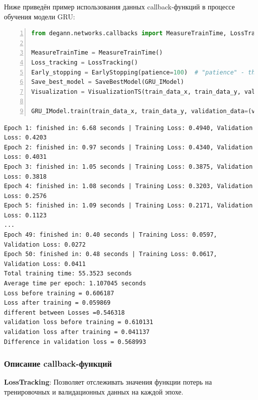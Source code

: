 Ниже приведён пример использования данных callback-функций в процессе обучения модели GRU:

\begin{lstlisting}[language=Python, breaklines, caption=Пример настройки и использования callback-функций, numbers=left]
from degann.networks.callbacks import MeasureTrainTime, LossTracking, EarlyStopping, SaveBestModel, VisualizationTS

MeasureTrainTime = MeasureTrainTime()
Loss_tracking = LossTracking()
Early_stopping = EarlyStopping(patience=100)  # "patience" - the number of epochs without improvement
Save_best_model = SaveBestModel(GRU_IModel)
Visualization = VisualizationTS(train_data_x, train_data_y, val_data_x, val_data_y, name_dataset.split('_')[0], funcs)

GRU_IModel.train(train_data_x, train_data_y, validation_data=(val_data_x, val_data_y), epochs=epochs, verbose=0, callbacks=[MeasureTrainTime, Loss_tracking, Early_stopping, Save_best_model, Visualization])
\end{lstlisting}

\begin{lstlisting}[language=Tex, breaklines, caption=Пример получения данных от callback-функций]
Epoch 1: finished in: 6.68 seconds | Training Loss: 0.4940, Validation Loss: 0.4203
Epoch 2: finished in: 0.97 seconds | Training Loss: 0.4340, Validation Loss: 0.4031
Epoch 3: finished in: 1.05 seconds | Training Loss: 0.3875, Validation Loss: 0.3818
Epoch 4: finished in: 1.08 seconds | Training Loss: 0.3203, Validation Loss: 0.2576
Epoch 5: finished in: 1.09 seconds | Training Loss: 0.2171, Validation Loss: 0.1123
...
Epoch 49: finished in: 0.40 seconds | Training Loss: 0.0597, Validation Loss: 0.0272
Epoch 50: finished in: 0.48 seconds | Training Loss: 0.0617, Validation Loss: 0.0411
Total training time: 55.3523 seconds
Average time per epoch: 1.107045 seconds
Loss before training = 0.606187
Loss after training = 0.059869
different between Losses =0.546318
validation loss before training = 0.610131
validation loss after training = 0.041137
Difference in validation loss = 0.568993
\end{lstlisting}

\subsubsection{Описание callback-функций}

\textbf{LossTracking}: Позволяет отслеживать значения функции потерь на тренировочных и валидационных данных на каждой эпохе.

